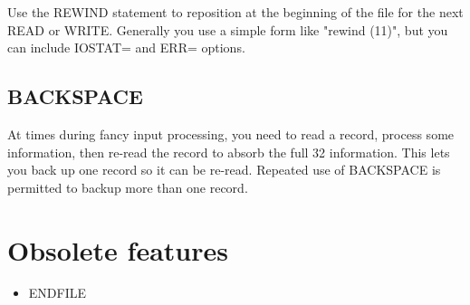 Use the REWIND statement to reposition at the beginning of the file
for the next READ or WRITE. Generally you use a simple form like
"rewind (11)", but you can include IOSTAT= and ERR= options. 

\subsection{BACKSPACE}
\label{sec:backspace}

 At times during fancy input processing, you need to read a record,
 process some information, then re-read the record to absorb the full
32 information. This lets you back up one record so it can be
 re-read. Repeated use of BACKSPACE is permitted to backup more than
 one record. 

\section{Obsolete features}
\label{sec:obsolete-features-2}


\begin{itemize}
\item ENDFILE
\end{itemize}

